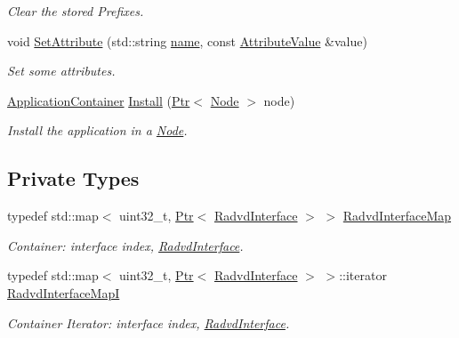 \begin{DoxyCompactItemize}
\begin{DoxyCompactList}\small\item\em Clear the stored Prefixes. \end{DoxyCompactList}\item 
void \hyperlink{classns3_1_1RadvdHelper_a5d03d92dd24d22d5a0eab9a28fc2cada}{Set\+Attribute} (std\+::string \hyperlink{generate__test__data__lte__spectrum__model_8m_ab74e6bf80237ddc4109968cedc58c151}{name}, const \hyperlink{classns3_1_1AttributeValue}{Attribute\+Value} \&value)
\begin{DoxyCompactList}\small\item\em Set some attributes. \end{DoxyCompactList}\item 
\hyperlink{classns3_1_1ApplicationContainer}{Application\+Container} \hyperlink{classns3_1_1RadvdHelper_ac0d0b33362b5bf0b852f01623f952ab1}{Install} (\hyperlink{classns3_1_1Ptr}{Ptr}$<$ \hyperlink{classns3_1_1Node}{Node} $>$ node)
\begin{DoxyCompactList}\small\item\em Install the application in a \hyperlink{classns3_1_1Node}{Node}. \end{DoxyCompactList}\end{DoxyCompactItemize}
\subsection*{Private Types}
\begin{DoxyCompactItemize}
\item 
typedef std\+::map$<$ uint32\+\_\+t, \hyperlink{classns3_1_1Ptr}{Ptr}$<$ \hyperlink{classns3_1_1RadvdInterface}{Radvd\+Interface} $>$ $>$ \hyperlink{classns3_1_1RadvdHelper_a8d968efa50941c7c0076046568ca5592}{Radvd\+Interface\+Map}
\begin{DoxyCompactList}\small\item\em Container\+: interface index, \hyperlink{classns3_1_1RadvdInterface}{Radvd\+Interface}. \end{DoxyCompactList}\item 
typedef std\+::map$<$ uint32\+\_\+t, \hyperlink{classns3_1_1Ptr}{Ptr}$<$ \hyperlink{classns3_1_1RadvdInterface}{Radvd\+Interface} $>$ $>$\+::iterator \hyperlink{classns3_1_1RadvdHelper_a6afae69b9c4d65676c548b8387ef312a}{Radvd\+Interface\+MapI}
\begin{DoxyCompactList}\small\item\em Container Iterator\+: interface index, \hyperlink{classns3_1_1RadvdInterface}{Radvd\+Interface}. \end{DoxyCompactList}\end{DoxyCompactItemize}
